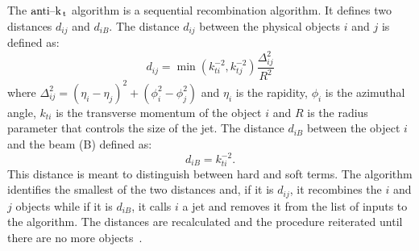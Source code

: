 The $\text{anti--k}_\mathrm{\, t}$ algorithm is a sequential recombination algorithm. It defines two
distances $d_{ij}$ and $d_{iB}$. The distance $d_{ij}$ between the physical
objects $i$ and $j$ is defined as:
\begin{equation}
  \label{eq:89}
  d_{ij} = \min(k_{ti}^{-2}, k_{tj}^{-2}) \frac{\Delta_{ij}^2}{R^2}
\end{equation}
where $\Delta_{ij}^2 = (\eta_i - \eta_j)^2 + (\phi_i^2 - \phi_j^2)$ and $\eta_i$
is the rapidity, $\phi_i$ is the azimuthal angle, $k_{ti}$ is the transverse
momentum of the object $i$ and $R$ is the radius parameter that controls the
size of the jet. The distance $d_{iB}$ between the object $i$ and the beam (B)
defined as:
\begin{equation}
  \label{eq:90}
  d_{iB} = k_{ti}^{-2}.
\end{equation}
This distance is meant to distinguish between hard and soft terms. The algorithm
identifies the smallest of the two distances and, if it is $d_{ij}$, it
recombines the $i$ and $j$ objects while if it is $d_{iB}$, it calls $i$ a jet
and removes it from the list of inputs to the algorithm. The distances are
recalculated and the procedure reiterated until there are no more
objects~\cite{Antikt}.
